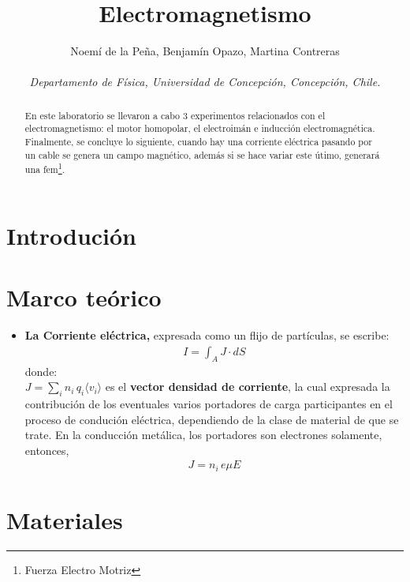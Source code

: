 \documentclass[]{article}
\title{Electromagnetismo}
\author{Noemí de la Peña, Benjamín Opazo, Martina Contreras \\ \\
\textit{ Departamento de Física, Universidad de Concepción, Concepción, Chile. }}
\date{}
\begin{document}
\maketitle 

\begin{abstract}
  En este laboratorio se llevaron a cabo 3 experimentos relacionados con el electromagnetismo:  el motor homopolar, el electroimán e inducción electromagnética.
  Finalmente, se concluye lo siguiente,  cuando hay una corriente eléctrica pasando por un cable se genera un campo magnético, además si se hace variar este útimo, generará una fem\footnote[1]{Fuerza Electro Motriz}.
  
\end{abstract}


\section*{Introdución}



\section*{Marco teórico}
\begin{itemize}
  \item \textbf{La Corriente eléctrica,} expresada como un flijo de partículas, se escribe:
  \begin{align*}
    I = \int_{A} J\cdot  dS
  \end{align*}
  donde: \\
    $J = \sum_{i} n_i \, q_i \langle v_i\rangle$ es el \textbf{vector densidad de corriente}, la cual expresada
    la contribución de los eventuales varios portadores de carga participantes en el proceso de condución eléctrica,
    dependiendo de la clase de material de que se trate. En la conducción metálica, los portadores son electrones solamente, entonces,
    \begin{align*}
      J = n_i \, e\mu E
    \end{align*} 
\end{itemize}




\section*{Materiales}
\end{document}

